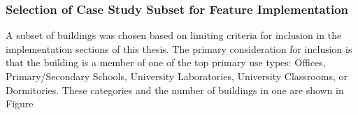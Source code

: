 \subsubsection{Selection of Case Study Subset for Feature Implementation}
\label{casestudysubset}

A subset of buildings was chosen based on limiting criteria for inclusion in the implementation sections of this thesis. The primary consideration for inclusion is that the building is a member of one of the top primary use types: Offices, Primary/Secondary Schools, University Laboratories, University Classrooms, or Dormitories. These categories and the number of buildings in one are shown in Figure 
